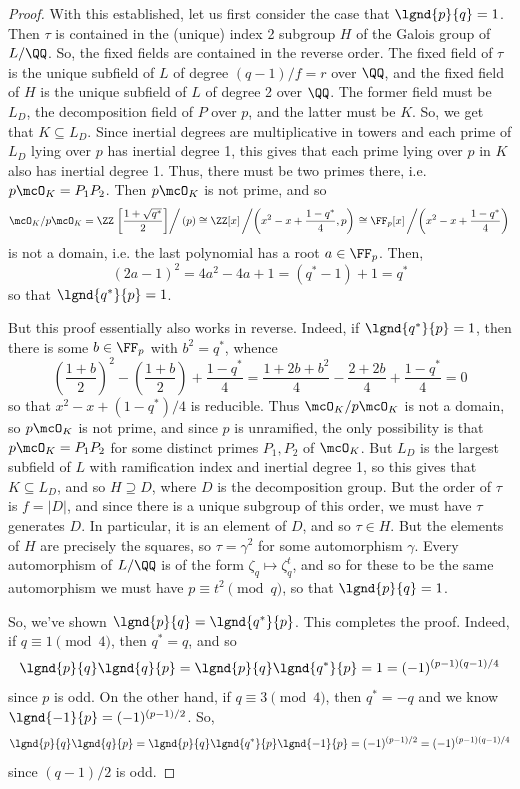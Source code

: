 \begin{proof}
	With this established, let us first consider the case that $\lgnd{p}{q} = 1$. Then $\tau$ is contained in the (unique) index 2 subgroup $H$ of the Galois group of $L/\QQ$. So, the fixed fields are contained in the reverse order. The fixed field of $\tau$ is the unique subfield of $L$ of degree $(q-1)/f = r$ over $\QQ$, and the fixed field of $H$ is the unique subfield of $L$ of degree 2 over $\QQ$. The former field must be $L_D$, the decomposition field of $P$ over $p$, and the latter must be $K$. So, we get that $K \subseteq L_D$. Since inertial degrees are multiplicative in towers and each prime of $L_D$ lying over $p$ has inertial degree 1, this gives that each prime lying over $p$ in $K$ also has inertial degree 1. Thus, there must be two primes there, i.e. $p\mcO_K = P_1P_2$. Then $p\mcO_K$ is not prime, and so
	\[ \mcO_K/p\mcO_K = \ZZ\left.\left[\frac{1+\sqrt{q^\ast}}{2}\right]\right/(p) \cong \ZZ[x]\left/\left(x^2-x+\frac{1-q^\ast}{4},p\right)\right. \cong \FF_p[x]\left/\left(x^2-x+\frac{1-q^\ast}{4}\right)\right. \]
	is not a domain, i.e. the last polynomial has a root $a \in \FF_p$. Then,
	\[ (2a-1)^2 = 4a^2-4a+1 = (q^\ast-1)+1 = q^\ast \]
	so that $\lgnd{q^\ast}{p} = 1$.
	
	But this proof essentially also works in reverse. Indeed, if $\lgnd{q^\ast}{p} = 1$, then there is some $b \in \FF_p$ with $b^2 = q^\ast$, whence
	\[ \left(\frac{1+b}{2}\right)^2-\left(\frac{1+b}{2}\right)+\frac{1-q^\ast}{4} = \frac{1+2b+b^2}{4}-\frac{2+2b}{4}+\frac{1-q^\ast}{4} = 0 \]
	so that $x^2-x+(1-q^\ast)/4$ is reducible. Thus $\mcO_K/p\mcO_K$ is not a domain, so $p\mcO_K$ is not prime, and since $p$ is unramified, the only possibility is that $p\mcO_K = P_1P_2$ for some distinct primes $P_1,P_2$ of $\mcO_K$. But $L_D$ is the largest subfield of $L$ with ramification index and inertial degree 1, so this gives that $K \subseteq L_D$, and so $H \supseteq D$, where $D$ is the decomposition group. But the order of $\tau$ is $f = |D|$, and since there is a unique subgroup of this order, we must have $\tau$ generates $D$. In particular, it is an element of $D$, and so $\tau \in H$. But the elements of $H$ are precisely the squares, so $\tau = \gamma^2$ for some automorphism $\gamma$. Every automorphism of $L/\QQ$ is of the form $\zeta_q \mapsto \zeta_q^t$, and so for these to be the same automorphism we must have $p \equiv t^2 \pmod{q}$, so that $\lgnd{p}{q} = 1$.

	So, we've shown $\lgnd{p}{q} = \lgnd{q^\ast}{p}$. This completes the proof. Indeed, if $q \equiv 1 \pmod{4}$, then $q^\ast = q$, and so
	\[ \lgnd{p}{q}\lgnd{q}{p} = \lgnd{p}{q}\lgnd{q^\ast}{p} = 1 = (-1)^{(p-1)(q-1)/4} \]
	since $p$ is odd. On the other hand, if $q \equiv 3 \pmod{4}$, then $q^\ast = -q$ and we know $\lgnd{-1}{p} = (-1)^{(p-1)/2}$. So,
	\[ \lgnd{p}{q}\lgnd{q}{p} = \lgnd{p}{q}\lgnd{q^\ast}{p}\lgnd{-1}{p} = (-1)^{(p-1)/2} = (-1)^{(p-1)(q-1)/4} \]
	since $(q-1)/2$ is odd.
\end{proof}


